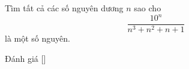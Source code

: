 \ifshowproblem
\begin{problem}\label{problem:JPN-2015-MO-P1}
	Tìm tất cả các số nguyên dương \( n \) sao cho 
	\[
		\frac{10^n}{n^3 + n^2 + n + 1}
	\]
	là một số nguyên.
\end{problem}
\fi

\ifshowinfo
Đánh giá [\textbf{}]
\fi
